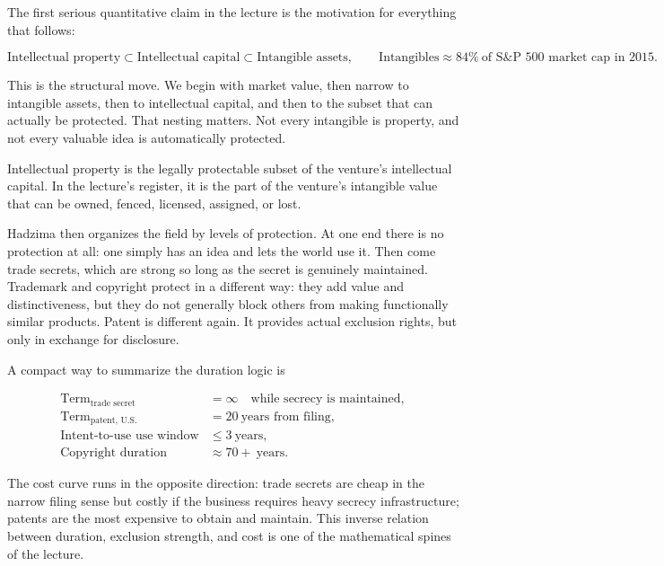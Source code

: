 The first serious quantitative claim in the lecture is the motivation for everything that follows:

\begin{equation}
\text{Intellectual property}\subset \text{Intellectual capital}\subset \text{Intangible assets},
\qquad
\text{Intangibles}\approx 84\%\ \text{of S\&P 500 market cap in 2015}.
\end{equation}

This is the structural move. We begin with market value, then narrow to intangible assets, then to intellectual capital, and then to the subset that can actually be protected. That nesting matters. Not every intangible is property, and not every valuable idea is automatically protected.

\begin{definition}
Intellectual property is the legally protectable subset of the venture's intellectual capital. In the lecture's register, it is the part of the venture's intangible value that can be owned, fenced, licensed, assigned, or lost.
\end{definition}

Hadzima then organizes the field by levels of protection. At one end there is no protection at all: one simply has an idea and lets the world use it. Then come trade secrets, which are strong so long as the secret is genuinely maintained. Trademark and copyright protect in a different way: they add value and distinctiveness, but they do not generally block others from making functionally similar products. Patent is different again. It provides actual exclusion rights, but only in exchange for disclosure.

A compact way to summarize the duration logic is

\begin{align}
\text{Term}_{\text{trade secret}} &= \infty \quad \text{while secrecy is maintained},\\
\text{Term}_{\text{patent, U.S.}} &= 20\ \text{years from filing},\\
\text{Intent-to-use use window} &\le 3\ \text{years},\\
\text{Copyright duration} &\approx 70+\ \text{years}.
\end{align}

The cost curve runs in the opposite direction: trade secrets are cheap in the narrow filing sense but costly if the business requires heavy secrecy infrastructure; patents are the most expensive to obtain and maintain. This inverse relation between duration, exclusion strength, and cost is one of the mathematical spines of the lecture.


